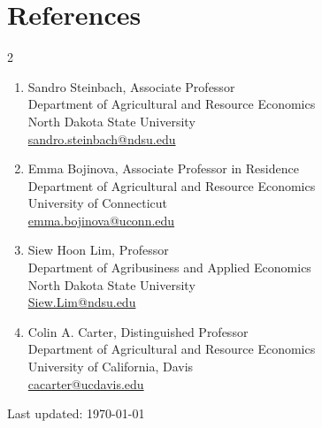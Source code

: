 \documentclass[10.5pt,letterpaper]{article}
\begin{document}
	\newpage
\section*{\textbf{References}}

\begin{multicols}{2}
	\begin{enumerate}[leftmargin=0in]
		
		\item[] Sandro Steinbach, Associate Professor \\
		Department of Agricultural and Resource Economics \\
		North Dakota State University \\
		\href{mailto:sandro.steinbach@ndsu.edu}{sandro.steinbach@ndsu.edu}
		
		\item[] Emma Bojinova, Associate Professor in Residence \\
		Department of Agricultural and Resource Economics \\
		University of Connecticut \\
		\href{mailto:emma.bojinova@uconn.edu}{emma.bojinova@uconn.edu}
		
		\item[] Siew Hoon Lim,  Professor \\
		Department of Agribusiness and Applied Economics \\
 		North Dakota State University \\
		\href{mailto:Siew.Lim@ndsu.edu}{Siew.Lim@ndsu.edu}
		
		\item[] Colin A. Carter, Distinguished Professor \\
		Department of Agricultural and Resource Economics \\
		University of California, Davis \\
		\href{mailto:cacarter@ucdavis.edu}{cacarter@ucdavis.edu}
		
	\end{enumerate}
\end{multicols}

	
	\vfill
	\begin{center}
		\begin{footnotesize}
			\raggedleft Last updated: \today
		\end{footnotesize}
	\end{center}
	
\end{document}
